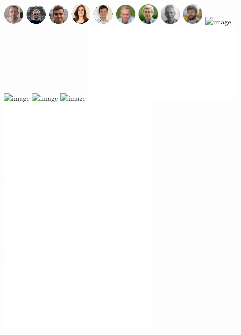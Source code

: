 \documentclass[aspectratio=169]{beamer}
\begin{document}
\begin{frame}
\begin{columns}
        \includegraphics[width=0.08\textwidth]{people/angus-peters-polychord.jpg}%
        \includegraphics[width=0.08\textwidth]{people/tamas-stenzel-polychord.jpg}%
        \includegraphics[width=0.08\textwidth]{people/david-yallup-polychord.jpg}%
        \includegraphics[width=0.08\textwidth]{people/rebecca-handley-polychord.jpg}%
        \includegraphics[width=0.08\textwidth]{people/adam-ormondroyd-polychord.jpg}%
        \includegraphics[width=0.08\textwidth]{people/mike-hobson-polychord.jpg}%
        \includegraphics[width=0.08\textwidth]{people/anthony-lasenby-polychord.jpg}%
        \includegraphics[width=0.08\textwidth]{people/mike-handley-polychord.jpg}%
        \includegraphics[width=0.08\textwidth]{people/will-handley-polychord.jpg}%
        \includegraphics<1|handout:0>[width=\textwidth]{figures/protein_1.png}%
        \includegraphics<2          >[width=\textwidth]{figures/protein_2.png}%
        \includegraphics<3|handout:0>[width=\textwidth]{figures/protein_3.png}%
        \includegraphics<4|handout:0>[width=\textwidth]{figures/lcoe.png}%
        \includegraphics<5|handout:0>[width=\textwidth]{figures/DKL_contour-cropped-crop.pdf}%
        \includegraphics<6|handout:0>[width=\textwidth]{figures/mean_DKL_optimise-3-crop.pdf}%
        \includegraphics<7|handout:0>[width=\textwidth]{figures/mean_DKL_optimise-4-crop.pdf}%
        \includegraphics<8|handout:0>[width=\textwidth]{figures/mean_DKL_optimise-5-crop.pdf}%
    \end{columns}
\end{frame}
\end{document}
